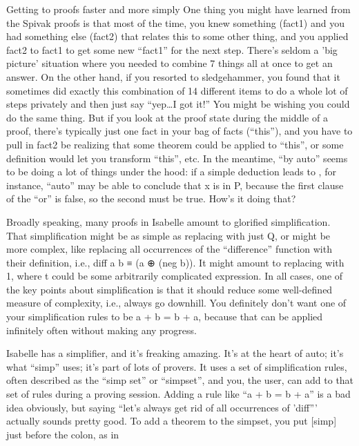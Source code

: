 Getting to proofs faster and more simply
One thing you might have learned from the Spivak proofs is that most of the time, you knew something (fact1) and you had something else (fact2) that relates this to some other thing, and you applied fact2 to fact1 to get some new ``fact1'' for the next step. There's seldom a 'big picture' situation where you needed to combine 7 things all at once to get an answer. On the other hand, if you resorted to sledgehammer, you found that it sometimes did exactly this combination of 14 different items to do a whole lot of steps privately and then just say ``yep\ldots I got it!'' You might be wishing you could do the same thing. But if you look at the proof state during the middle of a proof, there's typically just one fact in your bag of facts (``this''), and you have to pull in fact2 be realizing that some theorem could be applied to ``this'', or some definition would let you transform ``this'', etc. In the meantime, ``by auto'' seems to be doing a lot of things under the hood: if a simple deduction leads to , for instance, ``auto'' may be able to conclude that x is in P, because the first clause of the ``or'' is false, so the second must be true. How's it doing that? 

Broadly speaking, many proofs in Isabelle amount to glorified simplification. That simplification might be as simple as replacing  with just Q, or might be more complex, like replacing all occurrences of the ``difference'' function with their definition, i.e., diff a b ≡ (a ⊕ (neg b)). It might amount to replacing  with 1, where t could be some arbitrarily complicated expression. In all cases, one of the key points about simplification is that it should reduce some well-defined measure of complexity, i.e., always go downhill. You definitely don't want one of your simplification rules to be a + b = b + a, because that can be applied infinitely often without making any progress. 

Isabelle has a simplifier, and it's freaking amazing. It's at the heart of auto; it's what ``simp'' uses; it's part of lots of provers. It uses a set of simplification rules, often described as the ``simp set'' or ``simpset'', and you, the user, can add to that set of rules during a proving session. Adding a rule like ``a + b = b + a'' is a bad idea obviously, but saying ``let's always get rid of all occurrences of 'diff''' actually sounds pretty good. To add a theorem to the simpset, you put [simp] just before the colon, as in 


